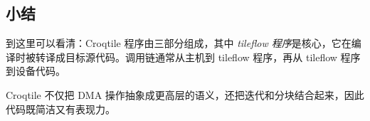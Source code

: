 \subsection*{小结}

到这里可以看清：Croqtile 程序由三部分组成，其中 \emph{tileflow 程序}是核心，它在编译时被转译成目标源代码。调用链通常从主机到 tileflow 程序，再从 tileflow 程序到设备代码。

Croqtile 不仅把 DMA 操作抽象成更高层的语义，还把迭代和分块结合起来，因此代码既简洁又有表现力。
